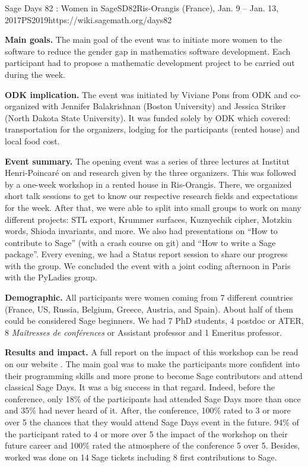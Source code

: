 \begin{event}{Sage Days 82 : Women in Sage}{SD82}{Ris-Orangis (France), Jan. 9 -- Jan. 13, 2017}{PS}{20}{19}{https://wiki.sagemath.org/days82}

\textbf{Main goals.} The main goal of the event was to initiate more women to the software \Sage to reduce the gender gap in mathematics software
development. Each participant had to propose a mathematic development project to be carried out during the week.

\textbf{ODK implication.} The event was initiated by Viviane Pons from ODK and co-organized with Jennifer Balakrishnan (Boston University) and Jessica Striker (North Dakota State University). It was funded solely by ODK which covered: transportation for the organizers, lodging for the participants (rented house) and local food cost. 

\textbf{Event summary.} The opening event was a series of three lectures at Institut Henri-Poincaré on \Sage and research given by the three organizers. This was followed by a one-week workshop in a rented house in Ris-Orangis. There, we organized short talk sessions to get to know our respective research fields and expectations for the week. After that, we were able to split into small groups to work on many different projects: STL export, Krummer surfaces, Kuznyechik cipher, Motzkin words, Shioda invariants, and more. We also had presentations on ``How to contribute to Sage'' (with a crash course on git) and ``How to write a Sage package''. Every evening, we had a Status report session to share our progress with the group. We concluded the event with a joint coding afternoon in Paris with the PyLadies group.

\textbf{Demographic.} All participants were women coming from 7 different countries (France, US, Russia, Belgium, Greece, Austria, and Spain). About half of them could be considered Sage beginners. We had 7 PhD students, 4 postdoc or ATER, 8 \textit{Maîtresses de conférences} or Assistant professor and 1 Emeritus professor. 

\textbf{Results and impact.} A full report on the impact of this workshop can be read on our website \cite{17PonsSD82}. The main goal was to make the participants more confident into their programming skills and more prone to become Sage contributors and attend classical Sage Days. It was a big success in that regard. Indeed, before the conference, only 18\% of the participants had attended Sage Days more than once and 35\% had never heard of it. After, the conference, 100\% rated to 3 or more over 5 the chances that they would attend Sage Days event in the future. 94\% of the participant rated to 4 or more over 5 the impact of the workshop on their future career and 100\% rated the atmosphere of the conference 5 over 5. Besides, worked was done on 14 Sage tickets including 8 first contributions to Sage.


\end{event}
